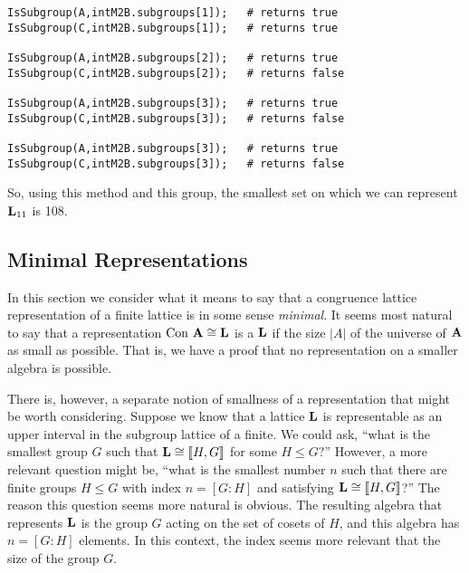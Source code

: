 {\small 
\begin{verbatim}
IsSubgroup(A,intM2B.subgroups[1]);   # returns true
IsSubgroup(C,intM2B.subgroups[1]);   # returns true

IsSubgroup(A,intM2B.subgroups[2]);   # returns true
IsSubgroup(C,intM2B.subgroups[2]);   # returns false

IsSubgroup(A,intM2B.subgroups[3]);   # returns true
IsSubgroup(C,intM2B.subgroups[3]);   # returns false

IsSubgroup(A,intM2B.subgroups[3]);   # returns true
IsSubgroup(C,intM2B.subgroups[3]);   # returns false
\end{verbatim}
}
So, using this method and this group, the smallest set on 
which we can represent $\mathbf{L}_{11}$ is 108.



\subsection{Minimal Representations}
In this section we consider what it means to say that
a congruence lattice representation of a finite lattice is in some sense
\emph{minimal}.
It seems most natural to say that a representation $\operatorname{Con\,} \mathbf{A} \cong \mathbf{L}$
is a  $\mathbf{L}$ if the size
$|A|$ of the universe of $\mathbf{A}$ as small as possible. That is, we have a proof
that no representation on a smaller algebra is possible.

There is, however, a separate notion of smallness of a representation that might
be worth considering.  Suppose we know that a lattice $\mathbf{L}$ is representable as
an upper interval in the subgroup lattice of a finite.  We could ask, ``what is
the smallest group $G$ such that $\mathbf{L} \cong \llbracket H, G \rrbracket$ for some $H\leq G$?''
However, a more relevant question might be, ``what is the smallest number $n$
such that there are finite groups $H\leq G$ with index $n = [G:H]$ and 
satisfying $\mathbf{L} \cong \llbracket H, G \rrbracket$?''  The reason this question seems more
natural is obvious. The resulting algebra that represents $\mathbf{L}$ is the group
$G$ acting on the set of cosets of $H$, and this algebra has $n = [G:H]$
elements.  In this context, the index seems more relevant that the size of the
group $G$.

